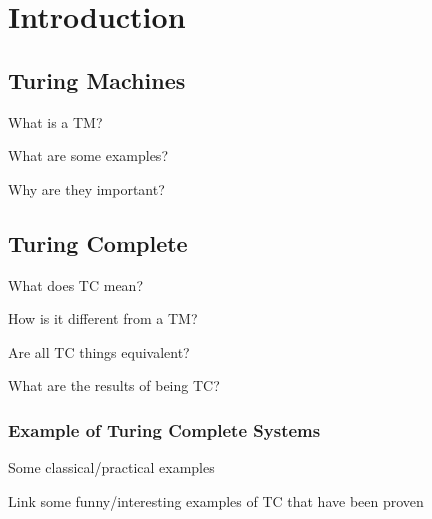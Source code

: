 \chapter{Introduction}
\section{Turing Machines}

What is a TM?

What are some examples?

Why are they important?

\section{Turing Complete}

What does TC mean?

How is it different from a TM?

Are all TC things equivalent?

What are the results of being TC?

\subsection{Example of Turing Complete Systems}

Some classical/practical examples

Link some funny/interesting examples of TC that have been proven